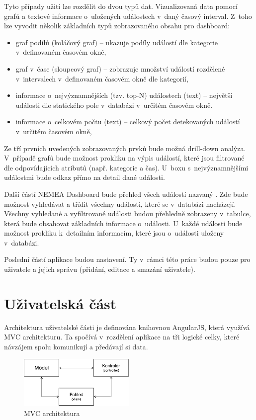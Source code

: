Tyto případy užití lze rozdělit do dvou typů dat. Vizualizovaná data pomocí grafů a textové informace o~uložených událostech v~daný časový interval. Z~toho lze vyvodit několik základních typů zobrazovaného obsahu pro dashboard:

\begin{itemize}
    \item graf podílů (koláčový graf) -- ukazuje podíly událostí dle kategorie v~definovaném časovém okně,
    \item graf v~čase (sloupcový graf) -- zobrazuje množství událostí rozdělené v~intervalech v~definovaném časovém okně dle kategorií,
    \item informace o~nejvýznamnějších (tzv. top-N) událostech (text) -- největší události dle statického pole v~databázi v~určitém časovém okně.
    \item informace o~celkovém počtu (text) -- celkový počet detekovaných událostí v~určitém časovém okně,
\end{itemize}

Ze tří prvních uvedených zobrazovaných prvků bude možná drill-down analýza. V~případě grafů bude možnost prokliku na výpis událostí, které jsou filtrované dle odpovídajících atributů (např. kategorie a čas). U~boxu s~nejvýznamnějšími událostmi bude odkaz přímo na detail dané události.

Další částí NEMEA Dashboard bude přehled všech událostí nazvaný . Zde bude možnost vyhledávat a třídit všechny události, které se v~databázi nacházejí. Všechny vyhledané a vyfiltrované události budou přehledně zobrazeny v~tabulce, která bude obsahovat základních informace o~události. U~každé události bude možnost prokliku k~detailním informacím, které jsou o~události uloženy v~databázi.

Poslední částí aplikace budou nastavení. Ty v~rámci této práce budou pouze pro uživatele a jejich správu (přidání, editace a smazání uživatele).

\section{Uživatelská část}
\label{sec:mvc}
Architektura uživatelské části je definována knihovnou AngularJS, která využívá MVC architekturu. Ta spočívá v~rozdělení aplikace na tři logické celky, které návzájem spolu komunikují a předávají si data.

\begin{figure}[ht]
    \centering
    \includegraphics[width=0.5\textwidth]{fig/mvc.pdf}
    \caption{MVC architektura} \label{fig:mvc}
\end{figure}

